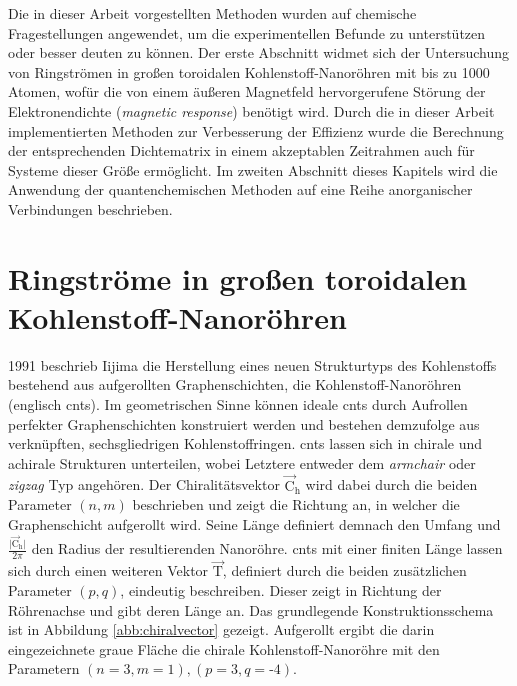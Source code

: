 Die in dieser Arbeit vorgestellten Methoden wurden auf chemische Fragestellungen angewendet, um die experimentellen Befunde zu unterstützen oder besser deuten zu können.
Der erste Abschnitt widmet sich der Untersuchung von Ringströmen in großen toroidalen Kohlenstoff-Nanoröhren mit bis zu 1000 Atomen, wofür die von einem äußeren Magnetfeld hervorgerufene Störung der Elektronendichte (\textit{magnetic response}) benötigt wird. Durch die in dieser Arbeit implementierten Methoden zur Verbesserung der Effizienz wurde die Berechnung der entsprechenden Dichtematrix in einem akzeptablen Zeitrahmen auch für Systeme dieser Größe ermöglicht. Im zweiten Abschnitt dieses Kapitels wird die Anwendung der quantenchemischen Methoden auf eine Reihe anorganischer Verbindungen beschrieben.  

\section{Ringströme in großen toroidalen Kohlenstoff-Nanoröhren}
1991 beschrieb Iijima\supercite{iijima1991helical} die Herstellung eines neuen Strukturtyps des Kohlenstoffs bestehend aus aufgerollten Graphenschichten, die Kohlenstoff-Nanoröhren (englisch \acp{cnt}). Im geometrischen Sinne können ideale \acp{cnt} durch Aufrollen perfekter Graphenschichten konstruiert werden und bestehen demzufolge aus verknüpften, sechsgliedrigen Kohlenstoffringen. \acp{cnt} lassen sich in chirale und achirale Strukturen unterteilen, wobei Letztere entweder dem \textit{armchair} oder \textit{zigzag} Typ angehören. Der Chiralitätsvektor $\vec{\text{C}}_\text{h}$ wird dabei durch die beiden Parameter $(n,m)$ beschrieben und zeigt die Richtung an, in welcher die Graphenschicht aufgerollt wird. Seine Länge definiert demnach den Umfang und $\frac{\vert\vec{\text{C}}_\text{h}\vert}{2\pi}$ den Radius der resultierenden Nanoröhre. \acp{cnt} mit einer finiten Länge lassen sich durch einen weiteren Vektor $\vec{\text{T}}$, definiert durch die beiden zusätzlichen Parameter $(p,q)$, eindeutig beschreiben. Dieser zeigt in Richtung der Röhrenachse und gibt deren Länge an. Das grundlegende Konstruktionsschema ist in Abbildung \ref{abb:chiralvector} gezeigt. Aufgerollt ergibt die darin eingezeichnete graue Fläche die chirale Kohlenstoff-Nanoröhre mit den Parametern $(n=3,m=1),(p=3,q=\textrm{-}4)$.
